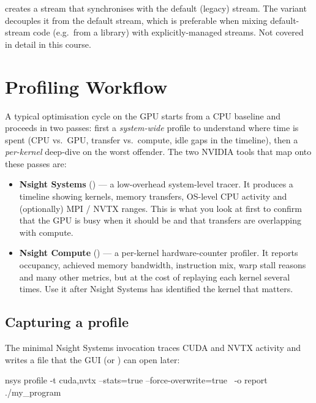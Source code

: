\begin{advancedblock}
 creates a stream that synchronises with the default (legacy) stream. The  variant decouples it from the default stream, which is preferable when mixing default-stream code (e.g.\ from a library) with explicitly-managed streams. Not covered in detail in this course.
\end{advancedblock}

\section{Profiling Workflow}

A typical optimisation cycle on the GPU starts from a CPU baseline and proceeds in two passes: first a \emph{system-wide} profile to understand where time is spent (CPU vs.\ GPU, transfer vs.\ compute, idle gaps in the timeline), then a \emph{per-kernel} deep-dive on the worst offender. The two NVIDIA tools that map onto these passes are:

\begin{itemize}
    \item \textbf{Nsight Systems} () --- a low-overhead system-level tracer. It produces a timeline showing kernels, memory transfers, OS-level CPU activity and (optionally) MPI / NVTX ranges. This is what you look at first to confirm that the GPU is busy when it should be and that transfers are overlapping with compute.
    \item \textbf{Nsight Compute} () --- a per-kernel hardware-counter profiler. It reports occupancy, achieved memory bandwidth, instruction mix, warp stall reasons and many other metrics, but at the cost of replaying each kernel several times. Use it after Nsight Systems has identified the kernel that matters.
\end{itemize}

\subsection{Capturing a profile}

The minimal Nsight Systems invocation traces CUDA and NVTX activity and writes a  file that the  GUI (or ) can open later:

\begin{codeblock}[language=bash]
nsys profile -t cuda,nvtx --stats=true --force-overwrite=true \
             -o report ./my_program
\end{codeblock}

